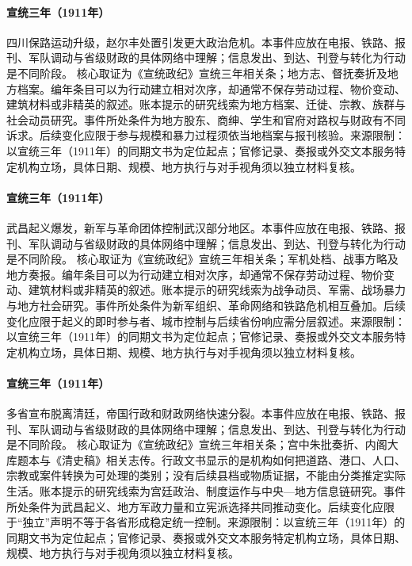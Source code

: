 \hypertarget{civic:EQ-1911-SICHUAN-RAILWAY-PROTEST}{}\paragraph{宣统三年（1911年）}四川保路运动升级，赵尔丰处置引发更大政治危机。本事件应放在电报、铁路、报刊、军队调动与省级财政的具体网络中理解；信息发出、到达、刊登与转化为行动是不同阶段。 核心取证为《宣统政纪》宣统三年相关条；地方志、督抚奏折及地方档案。编年条目可以为行动建立相对次序，却通常不保存劳动过程、物价变动、建筑材料或非精英的叙述。账本提示的研究线索为地方档案、迁徙、宗教、族群与社会动员研究。事件所处条件为地方股东、商绅、学生和官府对路权与财政有不同诉求。后续变化应限于参与规模和暴力过程须依当地档案与报刊核验。来源限制：以宣统三年（1911年）的同期文书为定位起点；官修记录、奏报或外交文本服务特定机构立场，具体日期、规模、地方执行与对手视角须以独立材料复核。
\hypertarget{civic:EQ-1911-WUCHANG-UPRISING}{}\paragraph{宣统三年（1911年）}武昌起义爆发，新军与革命团体控制武汉部分地区。本事件应放在电报、铁路、报刊、军队调动与省级财政的具体网络中理解；信息发出、到达、刊登与转化为行动是不同阶段。 核心取证为《宣统政纪》宣统三年相关条；军机处档、战事方略及地方奏报。编年条目可以为行动建立相对次序，却通常不保存劳动过程、物价变动、建筑材料或非精英的叙述。账本提示的研究线索为战争动员、军需、战场暴力与地方社会研究。事件所处条件为新军组织、革命网络和铁路危机相互叠加。后续变化应限于起义的即时参与者、城市控制与后续省份响应需分层叙述。来源限制：以宣统三年（1911年）的同期文书为定位起点；官修记录、奏报或外交文本服务特定机构立场，具体日期、规模、地方执行与对手视角须以独立材料复核。
\hypertarget{civic:EQ-1911-PROVINCIAL-INDEPENDENCE}{}\paragraph{宣统三年（1911年）}多省宣布脱离清廷，帝国行政和财政网络快速分裂。本事件应放在电报、铁路、报刊、军队调动与省级财政的具体网络中理解；信息发出、到达、刊登与转化为行动是不同阶段。 核心取证为《宣统政纪》宣统三年相关条；宫中朱批奏折、内阁大库题本与《清史稿》相关志传。行政文书显示的是机构如何把道路、港口、人口、宗教或案件转换为可处理的类别；没有后续县档或物质证据，不能由分类推定实际生活。账本提示的研究线索为宫廷政治、制度运作与中央—地方信息链研究。事件所处条件为武昌起义、地方军政力量和立宪派选择共同推动变化。后续变化应限于“独立”声明不等于各省形成稳定统一控制。来源限制：以宣统三年（1911年）的同期文书为定位起点；官修记录、奏报或外交文本服务特定机构立场，具体日期、规模、地方执行与对手视角须以独立材料复核。
